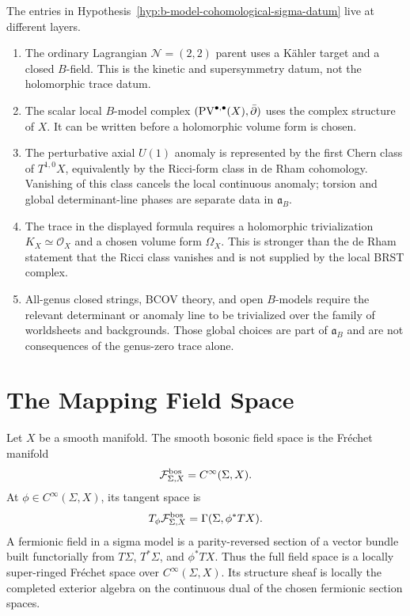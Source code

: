 \begin{definition}
\label{def:b-model-target-anomaly-layers}
The entries in Hypothesis~\ref{hyp:b-model-cohomological-sigma-datum} live at
different layers.
\begin{enumerate}[label=\textnormal{(\roman*)}]
\item The ordinary Lagrangian \(\mathcal N=(2,2)\) parent uses a K\"ahler
  target and a closed \(B\)-field.  This is the kinetic and supersymmetry
  datum, not the holomorphic trace datum.
\item The scalar local \(B\)-model complex
  \(({\rm PV}^{\bullet,\bullet}(X),\bar\partial)\) uses the complex structure
  of \(X\).  It can be written before a holomorphic volume form is chosen.
\item The perturbative axial \(U(1)\) anomaly is represented by the first
  Chern class of \(T^{1,0}X\), equivalently by the Ricci-form class in de
  Rham cohomology.  Vanishing of this class cancels the local continuous
  anomaly; torsion and global determinant-line phases are separate data in
  \(\mathfrak a_B\).
\item The trace in the displayed formula requires a holomorphic
  trivialization \(K_X\simeq\mathcal O_X\) and a chosen volume form
  \(\Omega_X\).  This is stronger than the de Rham statement that the Ricci
  class vanishes and is not supplied by the local BRST complex.
\item All-genus closed strings, BCOV theory, and open \(B\)-models require
  the relevant determinant or anomaly line to be trivialized over the family
  of worldsheets and backgrounds.  Those global choices are part of
  \(\mathfrak a_B\) and are not consequences of the genus-zero trace alone.
\end{enumerate}
\end{definition}

\section{The Mapping Field Space}

\begin{definition}
Let \(X\) be a smooth manifold.  The smooth bosonic field space is the
Fr\'echet manifold
\[
  \mathcal F_{\Sigma,X}^{\rm bos}
  =
  C^\infty(\Sigma,X).
\]
At \(\phi\in C^\infty(\Sigma,X)\), its tangent space is
\[
  T_\phi \mathcal F_{\Sigma,X}^{\rm bos}
  =
  \Gamma(\Sigma,\phi^\ast TX).
\]
A fermionic field in a sigma model is a parity-reversed section of a vector
bundle built functorially from \(T\Sigma\), \(T^\ast\Sigma\), and \(\phi^\ast TX\).
Thus the full field space is a locally super-ringed Fr\'echet space over
\(C^\infty(\Sigma,X)\).  Its structure sheaf is locally the completed exterior
algebra on the continuous dual of the chosen fermionic section spaces.
\end{definition}

